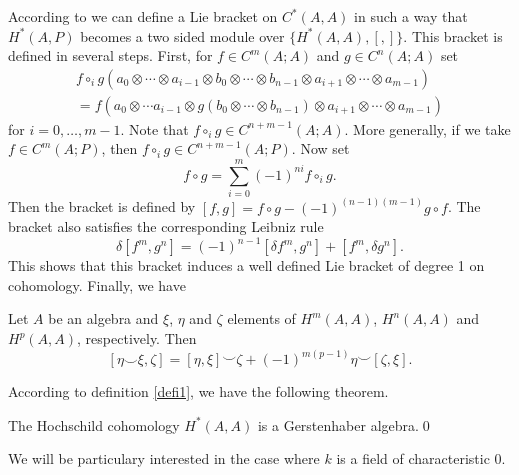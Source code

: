 \documentclass[TFM.tex]{subfiles}
\begin{document}
%

According to \cite[Theorem 4 of ]{Gerstenhaber} we can define a Lie bracket on $C^*(A,A)$ in such a way that $H^*(A,P)$ becomes a two sided module over $\{H^*(A,A),[,]\}$. This bracket is defined in several steps. First, for $f\in C^m(A;A)$ and $g\in C^n(A;A)$ set
\begin{gather*}
f\circ_i g(a_0\otimes\cdots\otimes a_{i-1}\otimes b_0\otimes\cdots\otimes b_{n-1}\otimes a_{i+1}\otimes\cdots \otimes a_{m-1})\\
=f(a_0\otimes \cdots a_{i-1}\otimes g(b_0\otimes\cdots\otimes b_{n-1})\otimes a_{i+1}\otimes\cdots\otimes a_{m-1})
\end{gather*}
for $i=0,\dots, m-1$. Note that $f\circ_i g\in C^{n+m-1}(A;A)$. More generally, if we take $f\in C^m(A;P)$, then $f\circ_ig\in C^{n+m-1}(A;P)$. Now set
\[
f\circ g=\sum_{i=0}^m (-1)^{ni}f\circ_i g.
\]
Then the bracket is defined by $[f,g]=f\circ g-(-1)^{(n-1)(m-1)}g\circ f$. The bracket also satisfies the corresponding Leibniz rule
\[\delta[f^m,g^n]=(-1)^{n-1}[\delta f^m,g^n]+[f^m,\delta g^n].\] This shows that this bracket induces a well defined Lie bracket of degree 1 on cohomology. Finally, we have

\begin{thm}\cite[Corollary 2 of ]{Gerstenhaber}
Let $A$ be an algebra and $\xi$, $\eta$ and $\zeta$ elements of $H^m(A,A)$, $H^n(A,A)$ and $H^p(A,A)$, respectively. Then
\[
[\eta\smile\xi, \zeta]=[\eta,\xi]\smile \zeta+(-1)^{m(p-1)}\eta\smile[\zeta,\xi].
\]
\end{thm}


According to definition \ref{defi1}, we have the following theorem.

\begin{thm}
	The Hochschild cohomology $H^*(A,A)$ is a Gerstenhaber algebra.\qed
	\end{thm} 

We will be particulary interested in the case where $k$ is a field of characteristic 0.
\end{document}
